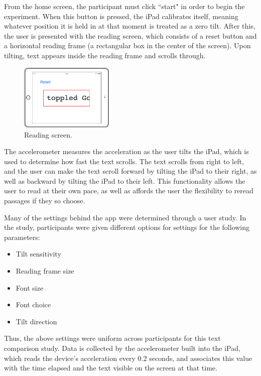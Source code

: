 \documentclass[11pt,letterpaper]{article}
\begin{document}
	From the home screen, the participant must click ``start" in order to begin the experiment. When this button is pressed, the iPad calibrates itself, meaning whatever position it is held in at that moment is treated as a zero tilt. After this, the user is presented with the reading screen, which consists of a reset button and a horizontal reading frame (a rectangular box in the center of the screen). Upon tilting, text appears inside the reading frame and scrolls through. 
	
	\begin{figure}[H]
		\centering
		\includegraphics[width=0.4\textwidth]{readingscreen.png}
		\caption{Reading screen.}
	\end{figure}
	
	The accelerometer measures the acceleration as the user tilts the iPad, which is used to determine how fast the text scrolls. The text scrolls from right to left, and the user can make the text scroll forward by tilting the iPad to their right, as well as backward by tilting the iPad to their left. This functionality allows the user to read at their own pace, as well as affords the user the flexibility to reread passages if they so choose.
	
	Many of the settings behind the app were determined through a user study. In the study, participants were given different options for settings for the following parameters:
	\begin{itemize}[noitemsep, nolistsep]
		\item Tilt sensitivity
		\item Reading frame size
		\item Font size
		\item Font choice
		\item Tilt direction
	\end{itemize}
	
	Thus, the above settings were uniform across participants for this text comparison study. Data is collected by the accelerometer built into the iPad, which reads the device's acceleration every 0.2 seconds, and associates this value with the time elapsed and the text visible on the screen at that time.
	
\end{document}
